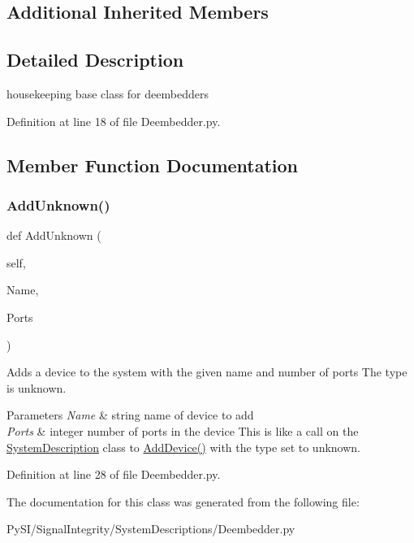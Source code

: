 \subsection*{Additional Inherited Members}


\subsection{Detailed Description}
housekeeping base class for deembedders 

Definition at line 18 of file Deembedder.\+py.



\subsection{Member Function Documentation}
\mbox{\label{classSignalIntegrity_1_1SystemDescriptions_1_1Deembedder_1_1Deembedder_a5ce06adeeb4dc8990aede7800d72a081}} 
\subsubsection{\texorpdfstring{Add\+Unknown()}{AddUnknown()}}
{\footnotesize\ttfamily def Add\+Unknown (\begin{DoxyParamCaption}\item[{}]{self,  }\item[{}]{Name,  }\item[{}]{Ports }\end{DoxyParamCaption})}



Adds a device to the system with the given name and number of ports The type is \textquotesingle{}unknown\textquotesingle{}. 


\begin{DoxyParams}{Parameters}
{\em Name} & string name of device to add \\
\hline
{\em Ports} & integer number of ports in the device This is like a call on the \hyperlink{namespaceSignalIntegrity_1_1SystemDescriptions_1_1SystemDescription}{System\+Description} class to \hyperlink{classSignalIntegrity_1_1SystemDescriptions_1_1SystemDescription_1_1SystemDescription_a377579b9eda21744cf7c7b48df997367}{Add\+Device()} with the type set to \textquotesingle{}unknown\textquotesingle{}. \\
\hline
\end{DoxyParams}


Definition at line 28 of file Deembedder.\+py.



The documentation for this class was generated from the following file\+:\begin{DoxyCompactItemize}
\item 
Py\+S\+I/\+Signal\+Integrity/\+System\+Descriptions/Deembedder.\+py\end{DoxyCompactItemize}
